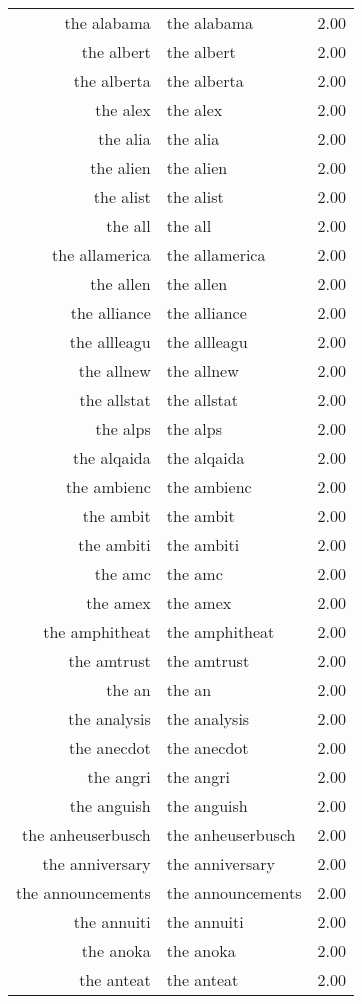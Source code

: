 \begin{table}[ht]
\begin{tabular}{rlr}
  the alabama & the alabama & 2.00 \\ 
  the albert & the albert & 2.00 \\ 
  the alberta & the alberta & 2.00 \\ 
  the alex & the alex & 2.00 \\ 
  the alia & the alia & 2.00 \\ 
  the alien & the alien & 2.00 \\ 
  the alist & the alist & 2.00 \\ 
  the all & the all & 2.00 \\ 
  the allamerica & the allamerica & 2.00 \\ 
  the allen & the allen & 2.00 \\ 
  the alliance & the alliance & 2.00 \\ 
  the allleagu & the allleagu & 2.00 \\ 
  the allnew & the allnew & 2.00 \\ 
  the allstat & the allstat & 2.00 \\ 
  the alps & the alps & 2.00 \\ 
  the alqaida & the alqaida & 2.00 \\ 
  the ambienc & the ambienc & 2.00 \\ 
  the ambit & the ambit & 2.00 \\ 
  the ambiti & the ambiti & 2.00 \\ 
  the amc & the amc & 2.00 \\ 
  the amex & the amex & 2.00 \\ 
  the amphitheat & the amphitheat & 2.00 \\ 
  the amtrust & the amtrust & 2.00 \\ 
  the an & the an & 2.00 \\ 
  the analysis & the analysis & 2.00 \\ 
  the anecdot & the anecdot & 2.00 \\ 
  the angri & the angri & 2.00 \\ 
  the anguish & the anguish & 2.00 \\ 
  the anheuserbusch & the anheuserbusch & 2.00 \\ 
  the anniversary & the anniversary & 2.00 \\ 
  the announcements & the announcements & 2.00 \\ 
  the annuiti & the annuiti & 2.00 \\ 
  the anoka & the anoka & 2.00 \\ 
  the anteat & the anteat & 2.00 \\ 

\end{tabular}
\end{table}
